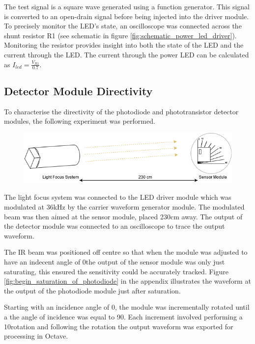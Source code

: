 The test signal is a square wave generated using a function generator. This signal is converted to an open-drain signal before being injected into the driver module. To precisely monitor the LED's state, an oscilloscope was connected across the shunt resistor R1 (see schematic in figure \ref{fig:schematic_power_led_driver}). Monitoring the resistor provides insight into both the state of the LED and the current through the LED. The current through the power LED can be calculated as \(I_{led} = \frac{V_{R1}}{0.7}\).


\subsection{Detector Module Directivity}

To characterise the directivity of the photodiode and phototransistor detector modules, the following experiment was performed.

\begin{figure}[H]
	\centering
	\includegraphics[width=.9\linewidth]{figures/experimentation/beam_angle_of_receiver.png}
	\label{fig:directivity_experiement_setup}
\end{figure}

The light focus system was connected to the LED driver module which was modulated at 36kHz by the carrier waveform generator module. The modulated beam was then aimed at the sensor module, placed 230cm away. The output of the detector module was connected to an oscilloscope to trace the output waveform.

The IR beam was positioned off centre so that when the module was adjusted to have an indecent angle of 0\textdegree the output of the sensor module was only just saturating, this ensured the sensitivity could be accurately tracked. Figure \ref{fig:begin_saturation_of_photodiode} in the appendix illustrates the waveform at the output of the photodiode module just after saturation.

Starting with an incidence angle of 0\textdegree, the module was incrementally rotated until a the angle of incidence was equal to 90\textdegree. Each increment involved performing a 10\textdegree rotation and following the rotation the output waveform was exported for processing in Octave.

